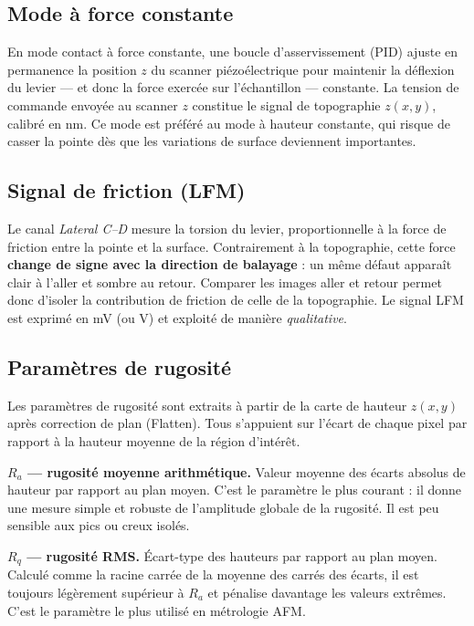 \documentclass[a4paper,10pt]{article}
\begin{document}
\subsection{Mode à force constante}

En mode contact à force constante, une boucle d'asservissement (PID) ajuste en permanence la position $z$ du scanner piézoélectrique pour maintenir la déflexion du levier --- et donc la force exercée sur l'échantillon --- constante. La tension de commande envoyée au scanner $z$ constitue le signal de topographie $z(x,y)$, calibré en nm. Ce mode est préféré au mode à hauteur constante, qui risque de casser la pointe dès que les variations de surface deviennent importantes.

\subsection{Signal de friction (LFM)}
\label{sec:lfm}

Le canal \textit{Lateral C--D} mesure la torsion du levier, proportionnelle à la
force de friction entre la pointe et la surface. Contrairement à la topographie,
cette force \textbf{change de signe avec la direction de balayage} : un même
défaut apparaît clair à l'aller et sombre au retour. Comparer les images aller et retour permet donc d'isoler la contribution de friction de celle de la
topographie. Le signal LFM est exprimé en mV (ou V) et exploité de manière \emph{qualitative}.

\subsection{Paramètres de rugosité}

Les paramètres de rugosité sont extraits à partir de la carte de hauteur $z(x,y)$
après correction de plan (Flatten). Tous s'appuient sur l'écart de chaque pixel par
rapport à la hauteur moyenne de la région d'intérêt.

\textbf{$R_a$ --- rugosité moyenne arithmétique.}
Valeur moyenne des écarts absolus de hauteur par rapport au plan moyen. C'est le
paramètre le plus courant : il donne une mesure simple et robuste de l'amplitude
globale de la rugosité. Il est peu sensible aux pics ou creux isolés.

\textbf{$R_q$ --- rugosité RMS.}
Écart-type des hauteurs par rapport au plan moyen. Calculé comme la racine carrée
de la moyenne des carrés des écarts, il est toujours légèrement supérieur à $R_a$ et
pénalise davantage les valeurs extrêmes. C'est le paramètre le plus utilisé en métrologie AFM.
\end{document}
